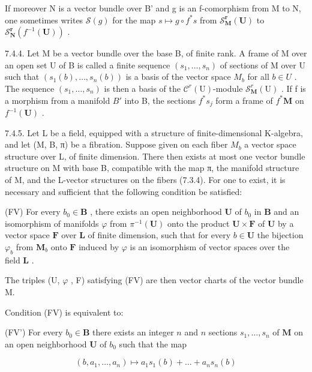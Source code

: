 If moreover N is a vector bundle over B' and g is an f-comorphism from M to N, one sometimes writes \(\mathcal{S}(g)\) for the map \(s \mapsto g \circ f^{*}s\) from \(\mathcal{S}_{\mathbf{M}}^{\mathbf{r}}(\mathbf{U})\) to \(\mathcal{S}_{\mathbf{N}}^{\mathbf{r}}(f^{-1}(\mathbf{U}))\) .

7.4.4. Let M be a vector bundle over the base B, of finite rank. A frame of M over an open set U of B is called a finite sequence \((s_{1},\ldots,s_{n})\) of sections of M over U such that \((s_{1}(b),\ldots,s_{n}(b))\) is a basis of the vector space \(M_{b}\) for all \(b\in U\) . The sequence \((s_{1},\ldots,s_{n})\) is then a basis of the \(\mathcal{C}^{r}(\mathrm{U})\)-module \(\mathcal{S}_{\mathbf{M}}^{r}(\mathrm{U})\) . If f is a morphism from a manifold \(B'\) into B, the sections \(f^{*}s_{j}\) form a frame of \(f^{*}\mathbf{M}\) on \(f^{-1}(\mathbf{U})\) .

7.4.5. Let L be a field, equipped with a structure of finite-dimensional K-algebra, and let (M, B, π) be a fibration. Suppose given on each fiber \(M_{b}\) a vector space structure over L, of finite dimension. There then exists at most one vector bundle structure on M with base B, compatible with the map π, the manifold structure of M, and the L-vector structures on the fibers (7.3.4). For one to exist, it is necessary and sufficient that the following condition be satisfied:

(FV) For every \(b_0 \in \mathbf{B}\) , there exists an open neighborhood \(\mathbf{U}\) of \(b_0\) in \(\mathbf{B}\) and an isomorphism of manifolds \(\varphi\) from \(\pi^{-1}(\mathbf{U})\) onto the product \(\mathbf{U} \times \mathbf{F}\) of \(\mathbf{U}\) by a vector space \(\mathbf{F}\) over \(\mathbf{L}\) of finite dimension, such that for every \(b \in \mathbf{U}\) the bijection \(\varphi_b\) from \(\mathbf{M}_b\) onto \(\mathbf{F}\) induced by \(\varphi\) is an isomorphism of vector spaces over the field \(\mathbf{L}\) .

The triples (U, \(\varphi\) , F) satisfying (FV) are then vector charts of the vector bundle M.

Condition (FV) is equivalent to:

(FV') For every \(b_0 \in \mathbf{B}\) there exists an integer \(n\) and \(n\) sections \(s_1, \ldots, s_n\) of \(\mathbf{M}\) on an open neighborhood \(\mathbf{U}\) of \(b_0\) such that the map

\[
(b, a _ {1}, \dots , a _ {n}) \mapsto a _ {1} s _ {1} (b) + \dots + a _ {n} s _ {n} (b)
\]

